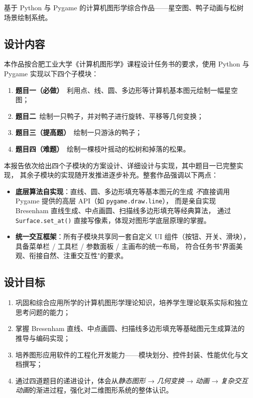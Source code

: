 \documentclass[12pt, a4paper]{article}
\begin{document}
基于 Python 与 Pygame 的计算机图形学综合作品——星空图、鸭子动画与松树场景绘制系统。

\subsection{设计内容}

本作品按合肥工业大学《计算机图形学》课程设计任务书的要求，使用 Python 与 Pygame
实现以下四个子模块：
\begin{enumerate}[label=（\arabic*）, leftmargin=*]
    \item \textbf{题目一（必做）}\ 利用点、线、圆、多边形等计算机基本图元绘制一幅星空图；
    \item \textbf{题目二}\ 绘制一只鸭子，并对鸭子进行旋转、平移等几何变换；
    \item \textbf{题目三（提高题）}\ 绘制一只游泳的鸭子；
    \item \textbf{题目四（难题）}\ 绘制一棵枝叶摇动的松树和掉落的松果。
\end{enumerate}

本报告依次给出四个子模块的方案设计、详细设计与实现，其中题目一已完整实现，
其余子模块的实现随开发推进逐步补充。整套作品强调以下两点：
\begin{itemize}[leftmargin=*]
    \item \textbf{底层算法自实现}：直线、圆、多边形填充等基本图元的生成
    \textit{不}直接调用 Pygame 提供的高层 API（如 \texttt{pygame.draw.line}），
    而是亲自实现 Bresenham 直线生成、中点画圆、扫描线多边形填充等经典算法，
    通过 \texttt{Surface.set\_at()} 直接写像素，体现对图形学底层原理的掌握。
    \item \textbf{统一交互框架}：所有子模块共享同一套自定义 UI 组件（按钮、开关、滑块），
    具备菜单栏 / 工具栏 / 参数面板 / 主画布的统一布局，
    符合任务书"界面美观、衔接自然、注重交互性"的要求。
\end{itemize}

\subsection{设计目标}

\begin{enumerate}[label=（\arabic*）, leftmargin=*]
    \item 巩固和综合应用所学的计算机图形学理论知识，培养学生理论联系实际和独立思考问题的能力；
    \item 掌握 Bresenham 直线、中点画圆、扫描线多边形填充等基础图元生成算法的推导与编码实现；
    \item 培养图形应用软件的工程化开发能力——模块划分、控件封装、性能优化与文档撰写；
    \item 通过四道题目的递进设计，体会从\textit{静态图形} → \textit{几何变换} →
    \textit{动画} → \textit{复杂交互动画}的渐进过程，强化对二维图形系统的整体认识。
\end{enumerate}
\end{document}
